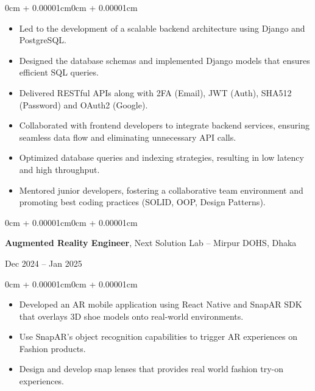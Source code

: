 \documentclass[10pt, letterpaper]{article}
\newenvironment{highlights}{
  \begin{itemize}[
    topsep=0.10cm,
    parsep=0.10cm,
    partopsep=0pt,
    itemsep=0pt,
    leftmargin=0cm + 10pt
  ]
}{
  \end{itemize}
}
\newenvironment{onecolentry}{
  \begin{adjustwidth}{0cm + 0.00001cm}{0cm + 0.00001cm}
}{
  \end{adjustwidth}
}
\newenvironment{twocolentry}[2][]{
  \onecolentry
  \def\secondColumn{#2}
  \setcolumnwidth{\fill, 4.5cm}
  \begin{paracol}{2}
}{
  \switchcolumn \raggedleft \secondColumn
  \end{paracol}
  \endonecolentry
}
\begin{document}
\vspace{0.10cm}

\begin{onecolentry}
    \begin{highlights}
        \item Led to the development of a scalable backend architecture using Django and PostgreSQL.
        \item Designed the database schemas and implemented Django models that ensures efficient SQL queries.
        \item Delivered RESTful APIs along with 2FA (Email), JWT (Auth), SHA512 (Password) and OAuth2 (Google).
        \item Collaborated with frontend developers to integrate backend services, ensuring seamless data flow and eliminating unnecessary API calls.
        \item Optimized database queries and indexing strategies, resulting in low latency and high throughput.
        \item Mentored junior developers, fostering a collaborative team environment and promoting best coding practices (SOLID, OOP, Design Patterns).
    \end{highlights}
\end{onecolentry}

\vspace{0.20cm}

\begin{twocolentry}{Dec 2024 -- Jan 2025}
    \textbf{Augmented Reality Engineer}, Next Solution Lab -- Mirpur DOHS, Dhaka
\end{twocolentry}

\vspace{0.10cm}

\begin{onecolentry}
    \begin{highlights}
        \item Developed an AR mobile application using React Native and SnapAR SDK that overlays 3D shoe models onto real-world environments.
        \item Use SnapAR's object recognition capabilities to trigger AR experiences on Fashion products.
        \item Design and develop snap lenses that provides real world fashion try-on experiences.
    \end{highlights}
\end{onecolentry}

\vspace{0.20cm}
\end{document}
